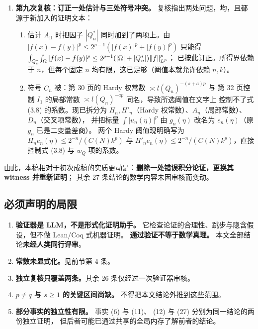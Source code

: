 \begin{enumerate}
\item \textbf{第九次复核：订正一处估计与三处符号冲突。}
  复核指出两处问题，均，且都源于新加入的证明文本：
  \begin{enumerate}[label=(\arabic*)]
    \item 估计 $A_{\mathrm{II}}$ 时把因子 $|Q_n^{*}|$ 同时加到了两项上。由
          $|f(x)-f(y)|^p\le2^{p-1}(|f(x)|^p+|f(y)|^p)$ 只能得
          $\int_{Q_n^*}\!\int_\Omega|f(x)-f(y)|^p\le2^{p-1}(|\Omega|+|Q_n^{*}|)\|f\|^p_{L^p}$；
          已按此订正。所得界依赖于 $n$，但每个固定 $n$ 均有限，这已足够（阈值本就允许依赖 $n,k$）。
    \item 符号 $C_n$ 被：第 30 页的 Hardy 权常数 $\asymp l(Q_n)^{-(s+a)p}$ 与
          第 32 页控制 $I_1$ 的局部常数 $\asymp l(Q_n)^{-ap}$ 同名，导致所选阈值在文字上
          控制不了式 (3.8) 的系数。现已拆分为
          $H_n,H'_n$（Hardy 权常数）、$A_n$（局部常数）、$D_n$（交叉项常数），
          并把标量 $\int|u_n(\eta)|^p$ 由 $g_n(\eta)$ 改名为 $e_n(\eta)$（原 $g_n$ 已是二变量差商）。
          两个 Hardy 阈值现明确写为 $H_n e_n(\eta)\le 2^{-n}/(C(N)k^{p})$ 与
          $H'_n e_n(\eta)\le 2^{-n}/(C(N)k^{p})$，直接控制式 (3.8) 与 $w_Q$ 项的系数。
  \end{enumerate}

\end{enumerate}

\noindent
由此，本稿相对于初次成稿的实质更动是：\textbf{删除一处错误积分论证，更换其 witness 并重新证明}；
其余 27 条结论的数学内容未因审核而变动。

\subsection{必须声明的局限}

\begin{enumerate}
\item \textbf{验证器是 LLM，不是形式化证明助手。}
它检查论证的合理性、跳步与隐含假设，但不做 Lean/Coq 式机器证明。
\textbf{通过验证不等于数学真理。}
本文全部结论\textbf{未经人类同行评审}。

\item \textbf{常数未显式化。}见前节第 4 条。

\item \textbf{独立复核只覆盖两条。}其余 26 条仅经过一次验证器审核。

\item \textbf{$p\neq q$ 与 $s\ge1$ 的关键区间尚缺。}
不得把本文结论外推到这些范围。

\item \textbf{部分事实的独立性有限。}
事实 (6) 与 (11)、
(12) 与 (27) 分别为同一结论的两份独立证明，
但后者可能已通过共享的全局内存了解前者的结论。
\end{enumerate}

